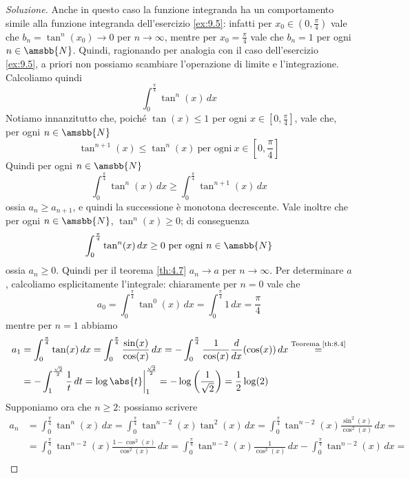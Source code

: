 \begin{proof}[Soluzione]
    Anche in questo caso la funzione integranda ha un comportamento simile alla funzione integranda dell'esercizio \ref{ex:9.5}: infatti per $x_0\in\left(0, \frac{\pi}{4}\right)$ vale che $b_n = \tan^n(x_0)\to 0$ per $n\to\infty$, mentre per $x_0=\frac{\pi}{4}$ vale che $b_n = 1$ per ogni $n\in\amsbb{N}$. Quindi, ragionando per analogia con il caso dell'esercizio \ref{ex:9.5}, a priori non possiamo scambiare l'operazione di limite e l'integrazione. Calcoliamo quindi
    \[
    \int_0^{\frac{\pi}{4}}\tan^n(x)\, dx
    \]
    Notiamo innanzitutto che, poiché $\tan(x)\le 1$ per ogni $x\in\left[0, \frac{\pi}{4}\right]$, vale che, per ogni $n\in\amsbb{N}$
    \[
    \tan^{n+1}(x)\le \tan^{n}(x) \ \text{per ogni} \ x\in\left[0, \frac{\pi}{4}\right]
    \]
    Quindi per ogni $n\in\amsbb{N}$
    \[
    \int_0^{\frac{\pi}{4}}\tan^n(x)\, dx \ge \int_0^{\frac{\pi}{4}}\tan^{n+1}(x)\, dx
    \]
    ossia $a_n \ge a_{n+1}$, e quindi la successione è monotona decrescente. Vale inoltre che per ogni $n\in\amsbb{N}$,  $\tan^n(x)\ge 0$; di conseguenza
    \[
    \int_0^{\frac{\pi}{4}}\tan^n(x)\, dx \ge 0 \ \text{per ogni} \ n\in\amsbb{N}
    \]
    ossia $a_n\ge 0$. Quindi per il teorema \ref{th:4.7} $a_n\to a$ per $n\to \infty$. Per determinare $a$, calcoliamo esplicitamente l'integrale: chiaramente per $n=0$ vale che
    \[
    a_0 = \int_0^{\frac{\pi}{4}}\tan^0(x)\, dx = \int_0^{\frac{\pi}{4}}1\, dx =\frac{\pi}{4} 
    \]
    mentre per $n=1$ abbiamo
    \[
    \begin{split}
        a_1 & = \int_0^{\frac{\pi}{4}}\tan(x)\, dx =\int_0^{\frac{\pi}{4}}\frac{\sin(x)}{\cos(x)}\, dx  = -\int_0^{\frac{\pi}{4}} \frac{1}{\cos(x)}\frac{d}{dx}(\cos(x))\, dx \overset{\text{Teorema \ref{th:8.4}}}{=}\\
        & =  -\int_1^{\frac{\sqrt{2}}{2}} \frac{1}{t}\, dt = \log{\abs{t}}\bigg|_1^{\frac{\sqrt{2}}{2}} = -\log\left(\frac{1}{\sqrt{2}}\right) = \frac{1}{2}\log(2)
    \end{split}
    \]
    Supponiamo ora che $n\ge 2$: possiamo scrivere
    \[
    \begin{split}
        a_n  & = \int_0^{\frac{\pi}{4}}\tan^n(x)\, dx = \int_0^{\frac{\pi}{4}} \tan^{n-2}(x)\tan^2(x)\, dx = \int_0^{\frac{\pi}{4}} \tan^{n-2}(x) \frac{\sin^2(x)}{\cos^2(x)}\, dx =\\
        & = \int_0^{\frac{\pi}{4}} \tan^{n-2}(x) \frac{1-\cos^2(x)}{\cos^2(x)}\, dx = \int_0^{\frac{\pi}{4}} \tan^{n-2}(x) \frac{1}{\cos^2(x)}\, dx - \int_0^{\frac{\pi}{4}} \tan^{n-2}(x)\, dx = \\

\end{split}\]
\end{proof}
